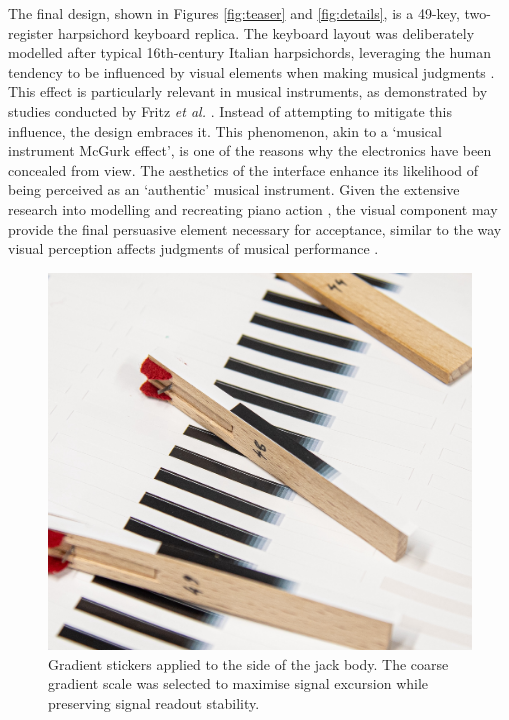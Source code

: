 The final design, shown in Figures \ref{fig:teaser} and \ref{fig:details}, is a 49-key, two-register harpsichord keyboard replica. The keyboard layout was deliberately modelled after typical 16th-century Italian harpsichords, leveraging the human tendency to be influenced by visual elements when making musical judgments \cite{Tsay2013}. This effect is particularly relevant in musical instruments, as demonstrated by studies conducted by Fritz \emph{et al.} \cite{Fritz2012, Fritz2014, Fritz2017}. Instead of attempting to mitigate this influence, the design embraces it. This phenomenon, akin to a `musical instrument McGurk effect’, is one of the reasons why the electronics have been concealed from view. The aesthetics of the interface enhance its likelihood of being perceived as an `authentic' musical instrument. Given the extensive research into modelling and recreating piano action \cite{Cadoz1990, Gillespie1996, Timmermans2020}, the visual component may provide the final persuasive element necessary for acceptance, similar to the way visual perception affects judgments of musical performance \cite{Tsay2013}.

\begin{figure}[!b]  
  \centering
  \includegraphics[width=0.9\linewidth,trim={0 0 0 0.5cm},clip]{src/images/tagging-jacks-3.jpg} 
  \caption{Gradient stickers applied to the side of the jack body. The coarse gradient scale was selected to maximise signal excursion while preserving signal readout stability.}
  \Description{} 
  \label{fig:jack-tags}
\end{figure}


